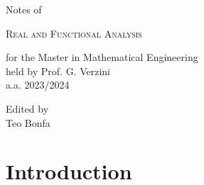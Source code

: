 \documentclass[10pt,a4paper,twoside]{book}
\numberwithin{figure}{section}
\numberwithin{equation}{section}
\begin{document}
\frontmatter

\pagestyle{empty}


\hypertarget{mytitlepage}{} %

\vspace*{\fill}

\begin{center}


	\vspace*{1.5cm}

	{\large Notes of}\\
	
	\vspace*{1.5cm}
	
	{\Huge \textsc{Real and Functional Analysis}}\\
	
	\vspace*{1.5cm}
	
	{\large for the Master in Mathematical Engineering}\\
	\vspace*{0.3cm}
	{\large held by Prof. G. Verzini}\\
	\vspace*{0.3cm}
	{\large a.a. 2023/2024}\\

	\vspace*{5cm}

	{\large Edited by}\\
	\vspace*{0.3cm}
	{\large Teo Bonfa}\\

	\vspace*{1.5cm}

\end{center}
\vspace*{\fill}
\clearpage


\cleardoublepage
\pagestyle{toc}
\hypertarget{mytoc}{} %
\bookmark[dest=mytoc,level=chapter]{\contentsname} %
\tableofcontents
\cleardoublepage


\pagestyle{fancy}
\mainmatter

\part{Introduction}
 \cleardoublepage
 \cleardoublepage
\end{document}
